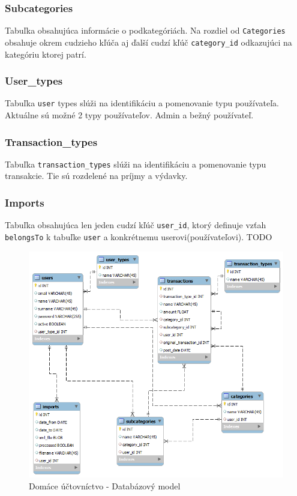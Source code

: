 \documentclass[12pt,onesided]{book}
\begin{document}
\subsubsection{Subcategories}
Tabuľka obsahujúca informácie o podkategóriách. Na rozdiel od \texttt{Categories} obsahuje okrem cudzieho kľúča aj ďalší cudzí kľúč \texttt{category\_id} odkazujúci na kategóriu ktorej patrí.
\subsubsection{User\_types}
Tabuľka \texttt{user} types slúži na identifikáciu a pomenovanie typu používateľa. Aktuálne sú možné 2 typy používateľov. Admin a bežný používateľ.
\subsubsection{Transaction\_types}
Tabuľka \texttt{transaction\_types} slúži na identifikáciu a pomenovanie typu transakcie. Tie sú rozdelené na príjmy a výdavky.
\subsubsection{Imports}
Tabuľka obsahujúca len jeden cudzí kľúč \texttt{user\_id}, ktorý definuje vzťah \texttt{belongsTo} k tabuľke \texttt{user} a konkrétnemu userovi(používateľovi). TODO
\begin{figure}[ht]
  \centering
      \includegraphics[width=15cm]{databazovy_model}
  \caption{Domáce účtovníctvo - Databázový model}
  \label{DataModel}
\end{figure}  
\end{document}
